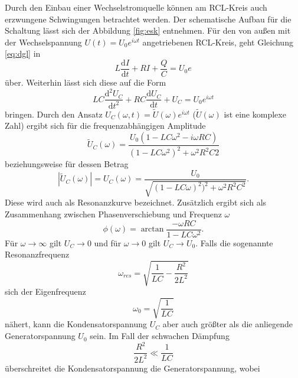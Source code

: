 Durch den Einbau einer Wechselstromquelle können am RCL-Kreis auch erzwungene Schwingungen 
betrachtet werden. Der schematische Aufbau für die Schaltung lässt sich der Abbildung \ref{fig:esk}
entnehmen. Für den von außen mit der Wechselspannung $U(t) = U_0 e^{i\omega t}$ angetriebenen 
RCL-Kreis, geht Gleichung \ref{eq:dgl} in 
\begin{equation}
    L \frac{\mathrm{d}I}{\mathrm{d}t} + RI + \frac{Q}{C} = U_0 e^{}
\end{equation}
\noindent über. Weiterhin lässt sich diese auf die Form
\begin{equation}
    LC \frac{\mathrm{d}^{2}U_C}{\mathrm{d}t^{2}} + RC \frac{\mathrm{d}U_C}{\mathrm{d}t} + U_C = U_0 e^{i\omega t}
\end{equation}
\noindent bringen. Durch den Ansatz $U_C(\omega,t) = \tilde{U}(\omega) e^{i\omega t}$ ($\tilde{U}(\omega)$ ist 
eine komplexe Zahl) ergibt sich 
für die frequenzabhängigen Amplitude 
\begin{equation}
    \tilde{U}_C(\omega) = \frac{U_0(1-LC\omega^{2}-i\omega RC)}{(1-LC \omega^{2})^{2} + \omega^{2}R^{2}C{2} }
\end{equation}
beziehungsweise für dessen Betrag
\begin{equation}
    |\tilde{U}_C(\omega)| = U_C(\omega)= \frac{U_0}{\sqrt{(1-LC\omega)^{2})^{2}+\omega^{2}R^{2}C^{2}}}.
\end{equation}
Diese wird auch als Resonanzkurve bezeichnet. Zusätzlich ergibt sich als Zusammenhang
zwischen Phasenverschiebung und Frequenz $\omega$
\begin{equation}
    \phi(\omega) = \arctan{\frac{-\omega RC}{1-LC \omega^{2}}}.
\end{equation}
\noindent
Für $\omega \rightarrow \infty$ gilt
$U_C \rightarrow 0$ und für $\omega \rightarrow 0$ gilt $U_C \rightarrow U_0$. Falls die 
sogenannte Resonanzfrequenz 
\begin{equation}
    \omega_{res} = \sqrt{\frac{1}{LC} - \frac{R^{2}}{2L^{2}}}
\end{equation}
\noindent 
sich der Eigenfrequenz 
\begin{equation}
    \omega_0 = \sqrt{\frac{1}{LC}}
\end{equation}
nähert, kann die Kondensatorspannung $U_C$ aber auch größter als die anliegende Generatorspannung
$U_0$ sein. Im Fall der schwachen Dämpfung
\begin{equation*}
    \frac{R^{2}}{2L^{2}} \ll \frac{1}{LC}
\end{equation*}
\noindent 
überschreitet die Kondensatorspannung die Generatorspannung, wobei 
